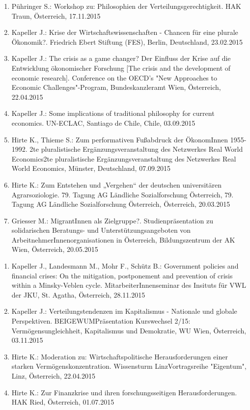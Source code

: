 \begin{enumerate}
	\item Pühringer S.: Workshop zu: Philosophien der Verteilungsgerechtigkeit. HAK Traun, Österreich, 17.11.2015
	\item Kapeller J.: Krise der Wirtschaftswissenschaften - Chancen für eine plurale Ökonomik?. Friedrich Ebert Stiftung (FES), Berlin, Deutschland, 23.02.2015
	\item Kapeller J.: The crisis as a game changer? Der Einfluss der Krise auf die Entwicklung ökonomischer Forschung [The crisis and the development of economic research]. Conference on the OECD's "New Approaches to Economic Challenges"-Program, Bundeskanzleramt Wien, Österreich, 22.04.2015
	\item Kapeller J.: Some implications of traditional philosophy for current economics. UN-ECLAC, Santiago de Chile, Chile, 03.09.2015
	\item Hirte K., Thieme S.: Zum performativen Fußabdruck der ÖkonomInnen 1955-1992. 2te pluralistische Ergänzungsveranstaltung des Netzwerkes Real World Economics2te pluralistische Ergänzungsveranstaltung des Netzwerkes Real World Economics, Münster, Deutschland, 07.09.2015
	\item Hirte K.: Zum Entstehen und „Vergehen“ der deutschen universitären Agrarsoziologie. 79. Tagung AG Ländliche Sozialforschung Österreich, 79. Tagung AG Ländliche Sozialforschung Österreich, Österreich, 20.03.2015
	\item Griesser M.: MigrantInnen als Zielgruppe?. Studienpräsentation zu solidarischen Beratungs- und Unterstützungsangeboten von ArbeitnehmerInnenorganisationen in Österreich, Bildungszentrum der AK Wien, Österreich, 20.05.2015
\end{enumerate}

\begin{enumerate}
	\item Kapeller J., Landesmann M., Mohr F., Schütz B.: Government policies and financial crises: On the mitigation, postponement and prevention of crisis within a Minsky-Veblen cycle. MitarbeiterInnenseminar des Insituts für VWL der JKU, St. Agatha, Österreich, 28.11.2015
	\item Kapeller J.: Verteilungstendenzen im Kapitalismus - Nationale und globale Perspektiven. BEIGEWUMPräsentation Kurswechsel 2/15: Vermögensungleichheit, Kapitalismus und Demokratie, WU Wien, Österreich, 03.11.2015
	\item Hirte K.: Moderation zu: Wirtschaftspolitische Herausforderungen einer starken Vermögenskonzentration. Wissensturm LinzVortragsreihe "Eigentum", Linz, Österreich, 22.04.2015
	\item Hirte K.: Zur Finanzkrise und ihren forschungsseitigen Herausforderungen. HAK Ried, Österreich, 01.07.2015
\end{enumerate}


